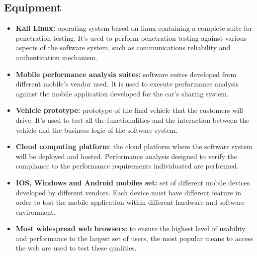 \subsection{Equipment}

\begin{itemize}
	\item \textbf{Kali Linux:} operating system based on linux containing a complete suite for penetration testing. It's used to perform penetration testing against various aspects of the software system, such as communications reliability and authentication mechanism.

	\item \textbf{Mobile performance analysis suites:} software suites developed from different mobile's vendor used. It is used to execute performance analysis against the mobile application developed for the car's sharing system.

	\item \textbf{Vehicle prototype:} prototype of the final vehicle that the customers will drive. It's used to test all the functionalities and the interaction between the vehicle and the business logic of the software system.

	\item \textbf{Cloud computing platform}: the cloud platform where the software system will be deployed and hosted. Performance analysis designed to verify the compliance to the performance requirements individuated are performed.

	\item \textbf{IOS, Windows and Android mobiles set:} set of different mobile devices developed by different vendors. Each device must have different feature in order to test the mobile application within different hardware and software environment.

	\item \textbf{Most widespread web browsers:} to ensure the highest level of usability and performance to the largest set of users, the most popular means to access the web are used to test these qualities.
\end{itemize}
